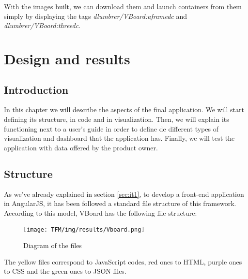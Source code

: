 \documentclass[a4paper, 12pt]{book}
\begin{document}
With the images built, we can download them and launch containers from them simply by displaying the tags \textit{dlumbrer/VBoard:aframedc} and \textit{dlumbrer/VBoard:threedc}.

 
\cleardoublepage
\chapter{Design and results}
\label{chap:dai}

\section{Introduction}
\label{sec:dint}

In this chapter we will describe the aspects of the final application. We will start defining its structure, in code and in visualization. Then, we will explain its functioning next to a user's guide in order to define de different types of visualization and dashboard that the application has. Finally, we will test the application with data offered by the product owner.

\section{Structure}

As we've already explained in section \ref{sec:it1}, to develop a front-end application in AngularJS, it has been followed a standard file structure of this framework. According to this model, VBoard has the following file structure:

\begin{figure}[H]
  \centering
  \texttt{[image: TFM/img/results/Vboard.png]}
  \caption{Diagram of the files}
  \label{fig:codediagram}
\end{figure}

The yellow files correspond to JavaScript codes, red ones to HTML, purple ones to CSS and the green ones to JSON files.
\end{document}
